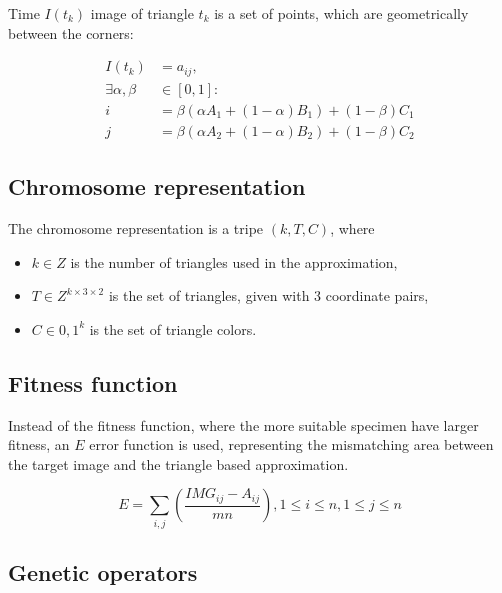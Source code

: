 \documentclass[conference]{IEEEtran}
\begin{document}
Time $I(t_k)$ image of triangle $t_k$ is a set of points, which are geometrically
between the corners:

\begin{equation}
	\begin{split}
	I(t_k) &= {a_{ij}},\\
	\exists \alpha, \beta &\in [0, 1]:\\
	i &= \beta(\alpha A_1 + (1-\alpha)B_1)+(1-\beta)C_1\\
	j &= \beta(\alpha A_2 + (1-\alpha)B_2)+(1-\beta)C_2
	\end{split}
\end{equation}

\subsection{Chromosome representation}

The chromosome representation is a tripe $(k, T, C)$, where

\begin{itemize}

	\item{$k \in Z$ is the number of triangles used in the approximation,}

	\item{$T \in Z^{k \times 3 \times 2}$ is the set of triangles, given with 3 coordinate pairs,}

	\item{$C \in {0,1}^k$ is the set of triangle colors.}

\end{itemize}

\subsection{Fitness function}

Instead of the fitness function, where the more suitable
specimen have larger fitness, an $E$ error function is used, representing
the mismatching area between the target image and the triangle
based approximation.

\begin{equation}
	E = \sum_{i,j} \left( \frac{IMG_{ij}-A_{ij}}{mn} \right), 1 \leq i \leq n, 1 \leq j \leq n
\end{equation}

\subsection{Genetic operators}
\end{document}
